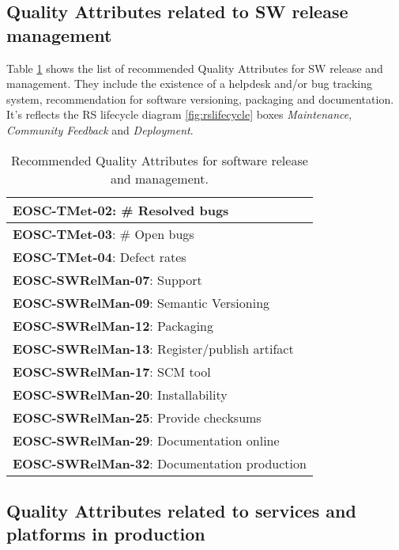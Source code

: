 \subsection{Quality Attributes related to SW release management}

Table \ref{tab:rs_rel} shows the list of recommended Quality Attributes for SW release and management. They include the existence of a helpdesk and/or bug tracking system, recommendation for software versioning, packaging and documentation. It's reflects the RS lifecycle diagram \ref{fig:rslifecycle} boxes \textit{Maintenance}, \textit{Community Feedback} and \textit{Deployment}.

\begin{center}
\begin{table}[h]
    \small
    \begin{tabular}{|p{\linewidth}|} \hline

        \textbf{EOSC-TMet-02}: \# Resolved bugs \\ \hline
        \textbf{EOSC-TMet-03}: \# Open bugs \\ \hline
        \textbf{EOSC-TMet-04}: Defect rates \\ \hline
        \textbf{EOSC-SWRelMan-07}: Support \\ \hline
        \textbf{EOSC-SWRelMan-09}: Semantic Versioning \\ \hline
        \textbf{EOSC-SWRelMan-12}: Packaging \\ \hline
        \textbf{EOSC-SWRelMan-13}: Register/publish artifact \\ \hline
        \textbf{EOSC-SWRelMan-17}: SCM tool \\ \hline
        \textbf{EOSC-SWRelMan-20}: Installability \\ \hline
        \textbf{EOSC-SWRelMan-25}: Provide checksums \\ \hline
        \textbf{EOSC-SWRelMan-29}: Documentation online \\ \hline
        \textbf{EOSC-SWRelMan-32}: Documentation production \\ \hline

    \end{tabular}
    \caption{Recommended Quality Attributes for software release and management.}
    \label{tab:rs_rel}
\end{table}
\end{center}

\subsection{Quality Attributes related to services and platforms in production}

